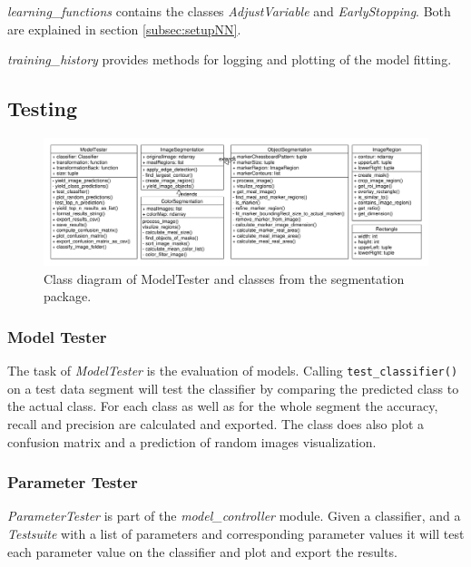 		\textit{learning\_functions} contains the classes \textit{AdjustVariable} and \textit{EarlyStopping}. Both are explained in section \ref{subsec:setupNN}.
		
		\textit{training\_history} provides methods for logging and plotting of the model fitting.
	
	\subsection{Testing}
	
	\begin{figure}
		\centering
		\includegraphics[width=\linewidth]{figures/implementation_misc_segmentation}
		
		\caption{Class diagram of ModelTester and classes from the segmentation package.}
		\label{fig:testerSegmentation}
	\end{figure}
		\subsubsection*{Model Tester}	
		The task of \textit{ModelTester} is the evaluation of models. Calling \verb|test_classifier()| on a test data segment will test the classifier by comparing the predicted class to the actual class. For each class as well as for the whole segment the accuracy, recall and precision are calculated and exported. The class does also plot a confusion matrix and a prediction of random images visualization. 
		
		\subsubsection*{Parameter Tester}
		\textit{ParameterTester} is part of the \textit{model\_controller} module. Given a classifier, and a \textit{Testsuite} with a list of parameters and corresponding parameter values it will test each parameter value on the classifier and plot and export the results.	
	
